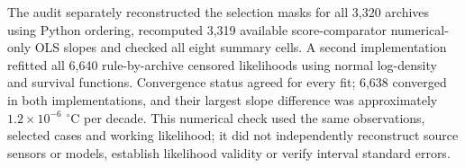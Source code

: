 The audit separately reconstructed the selection masks for all 3,320 archives using Python ordering, recomputed 3,319 available score-comparator numerical-only OLS slopes and checked all eight summary cells. A second implementation refitted all 6,640 rule-by-archive censored likelihoods using normal log-density and survival functions. Convergence status agreed for every fit; 6,638 converged in both implementations, and their largest slope difference was approximately $1.2\times10^{-6}$ $^{\circ}$C per decade. This numerical check used the same observations, selected cases and working likelihood; it did not independently reconstruct source sensors or models, establish likelihood validity or verify interval standard errors.
